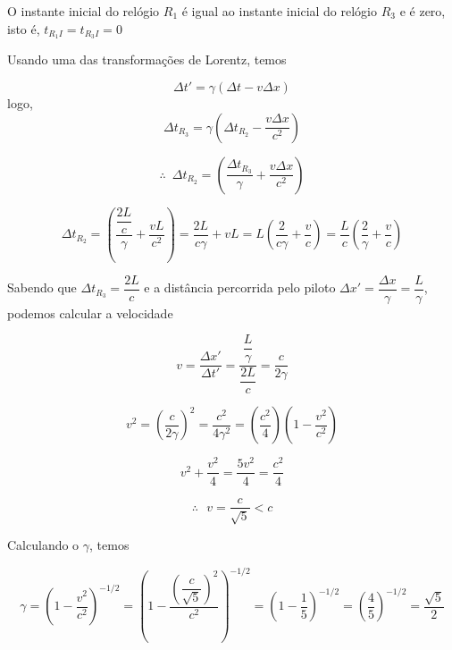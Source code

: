\documentclass[10pt,a4paper]{article}
\begin{document}
\begin{enumerate}
	O instante inicial do relógio $ R_1 $ é igual ao instante inicial do relógio $ R_3 $ e é zero, isto é, $ t_{R_1I} = t_{R_3I} = 0  $
	
	Usando uma das transformações de Lorentz, temos
	
	\begin{equation*}
		\Delta t' = \gamma ( \Delta t - v \Delta x)
	\end{equation*}
	logo,
	\begin{equation*}
		\Delta t_{R_3} = \gamma ( \Delta t_{R_2} - \dfrac{v \Delta x}{c^2})
	\end{equation*}

	\begin{equation*}
		\therefore \,\,\,\Delta t_{R_2} =  ( \dfrac{\Delta t_{R_3}}{\gamma} + \dfrac{v \Delta x}{c^2})
	\end{equation*}

	\begin{equation*}
		\Delta t_{R_2} =  ( \dfrac{\dfrac{2L}{c}}{\gamma} + \dfrac{v L}{c^2}) = \dfrac{2L}{c\gamma} + vL = L (\dfrac{2}{c\gamma} + \dfrac{v}{c}) = \dfrac{L}{c} (\dfrac{2}{\gamma} + \dfrac{v}{c})
	\end{equation*}

	Sabendo que $ \Delta t_{R_3} = \dfrac{2L}{c} $ e a distância percorrida pelo piloto $ \Delta x\prime = \dfrac{\Delta x}{\gamma} = \dfrac{L}{\gamma} $, podemos calcular a velocidade
	
	\begin{equation*}
		v = \dfrac{\Delta x\prime}{\Delta t\prime} = \dfrac{\dfrac{L}{\gamma}}{\dfrac{2L}{c}} = \dfrac{c}{2\gamma}
	\end{equation*}

	\begin{equation*}
		v^2 = (\dfrac{c}{2\gamma})^2 = \dfrac{c^2}{4\gamma^2} = (\dfrac{c^2}{4}) (1 - \dfrac{v^2}{c^2})
	\end{equation*}

	\begin{equation*}
		v^2 + \dfrac{v^2}{4}= \dfrac{5v^2}{4}=  \dfrac{c^2}{4}
	\end{equation*}
	
	\begin{equation*}
	 \therefore	\,\,\,\, v  = \dfrac{c}{\sqrt{5}} < c
	\end{equation*}

	Calculando o $ \gamma $, temos
	
	\begin{equation*}
		\gamma = (1-\dfrac{v^2}{c^2})^{-1/2} = (1-\dfrac{(\dfrac{c}{\sqrt{5}})^2}{c^2})^{-1/2} =(1-\dfrac{1}{5})^{-1/2} = (\dfrac{4}{5})^{-1/2} = \dfrac{\sqrt{5}}{2}
	\end{equation*}


\end{enumerate}
\end{document}
